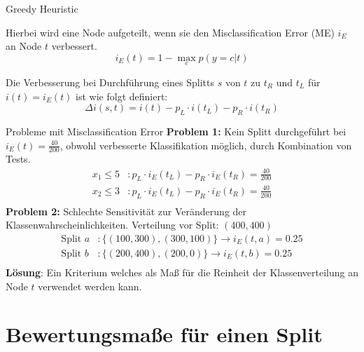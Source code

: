 \documentclass{beamer}
\begin{document}
\begin{frame}{Greedy Heuristic}

Hierbei wird eine Node aufgeteilt, wenn sie den Misclassification Error (ME) $i_E$ an Node $t$ verbessert.
   \[
   	i_E (t) = 1 - \max_c p(y = c | t)
   \]

Die Verbesserung bei Durchführung eines Splitts $s$ von $t$ zu $t_R$ und $t_L$ für $i(t) = i_E (t) $ ist wie folgt definiert: 
\[
	\Delta i(s, t) = i(t) - p_L \cdot i(t_L) - p_R \cdot i(t_R)
\]	

\end{frame}
\begin{frame}{Probleme mit Misclassification Error}
\textbf{Problem 1:} Kein Splitt durchgeführt bei $i_E (t) = \frac{40}{200}$, obwohl verbesserte Klassifikation möglich, durch Kombination von Tests.
 \begin{align*}
 	x_1 \leq 5&: p_L \cdot i_E (t_L) - p_R \cdot i_E (t_R) = \frac{40}{200} \\
	x_2 \leq 3&: p_L \cdot i_E (t_L) - p_R \cdot i_E (t_R) = \frac{40}{200} \\
 \end{align*}
\textbf{Problem 2:}
Schlechte Sensitivität zur Veränderung der Klassenwahrscheinlichkeiten.
Verteilung vor Split: $(400, 400)$
 \begin{align*}
 	\text{Split } a &: \{(100,300), (300,100)\} \rightarrow i_E (t, a) = 0.25 \\
	\text{Split } b &: \{(200,400), (200,0)\} \rightarrow i_E (t, b) = 0.25 \\
 \end{align*}
 \textbf{Lösung}: Ein Kriterium welches als Maß für die Reinheit der Klassenverteilung an Node $t$ verwendet werden kann.
\end{frame}


\section{Bewertungsmaße für einen Split}
\end{document}

